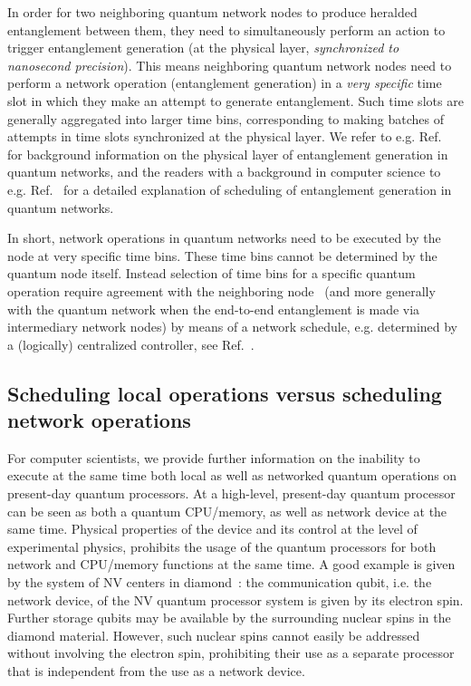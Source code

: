 In order for two neighboring quantum network nodes to produce heralded entanglement between them, they need to simultaneously perform an action to trigger entanglement generation (at the physical layer, \emph{synchronized to nanosecond precision}). This means neighboring quantum network nodes need to perform a network operation (entanglement generation) in a \emph{very specific} time slot in which they make an attempt to generate entanglement. Such time slots are generally aggregated into larger time bins, corresponding to making batches of attempts in time slots synchronized at the physical layer. We refer to e.g. Ref.~\cite{pompili_2022_experimental} for background information on the physical layer of entanglement generation in quantum networks, and the readers with a background in computer science to e.g. Ref.~\cite{dahlberg_2019_egp} for a detailed explanation of scheduling of entanglement generation in quantum networks.

In short, network operations in quantum networks need to be executed by the node at very specific time bins. These time bins cannot be determined by the quantum node itself. Instead selection of time bins for a specific quantum operation require agreement with the neighboring node~\cite{dahlberg_2019_egp} (and more generally with the quantum network when the end-to-end entanglement is made via intermediary network nodes) by means of a network schedule, e.g. determined by a (logically) centralized controller, see Ref.~\cite{skrzypczyk_2021_arch}.

\subsection{Scheduling local operations versus scheduling network operations}

For computer scientists, we provide further information on the inability to execute at the same time both local as well as networked quantum operations on present-day quantum processors. At a high-level, present-day quantum processor can be seen as both a quantum \ac{CPU}/memory, as well as network device at the same time. Physical properties of the device and its control at the level of experimental physics, prohibits the usage of the quantum processors for both network and \ac{CPU}/memory functions at the same time. A good example is given by the system of \ac{NV} centers in diamond~\cite{kalb_2017_entanglement,humphreys_2018_delivery}: the communication qubit, i.e. the network device, of the \ac{NV} quantum processor system is given by its electron spin. Further storage qubits may be available by the surrounding nuclear spins in the diamond material. However, such nuclear spins cannot easily be addressed without involving the electron spin, prohibiting their use as a separate processor that is independent from the use as a network device. 

